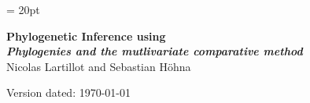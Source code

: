 \documentclass[11pt]{article}
\begin{document}
\renewcommand{\headrulewidth}{0.5pt}
\headsep = 20pt
\lhead{ }
\thispagestyle{plain}
\begin{center}

\textbf{\LARGE Phylogenetic Inference using \RevBayes}\\\vspace{2mm}
\textbf{\it{\Large Phylogenies and the mutlivariate comparative method}}\\\vspace{2mm}
\vspace{1cm}
{\Large Nicolas Lartillot and Sebastian H{\"o}hna}
\vspace{1cm}
\end{center}

\def \ResourcePath {./}
\def \GlobalResourcePath {../}


Version dated: \today
\end{document}
